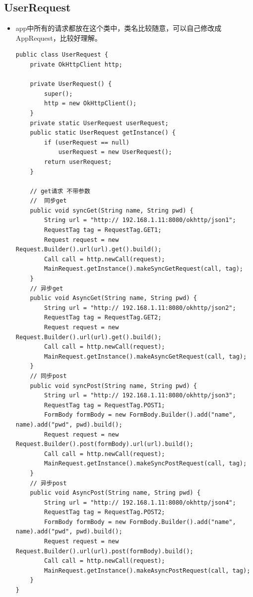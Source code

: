 \documentclass[9pt, b5paper]{article}
\begin{document}
\subsection{UserRequest}
\label{sec-4-8}
\begin{itemize}
\item app中所有的请求都放在这个类中，类名比较随意，可以自己修改成AppRequest，比较好理解。
\begin{verbatim}
public class UserRequest {
    private OkHttpClient http;

    private UserRequest() {
        super();
        http = new OkHttpClient();
    }
    private static UserRequest userRequest;
    public static UserRequest getInstance() {
        if (userRequest == null) 
            userRequest = new UserRequest();
        return userRequest;
    }

    // get请求 不带参数
    //  同步get
    public void syncGet(String name, String pwd) {
        String url = "http:// 192.168.1.11:8080/okhttp/json1";
        RequestTag tag = RequestTag.GET1;
        Request request = new Request.Builder().url(url).get().build();
        Call call = http.newCall(request);
        MainRequest.getInstance().makeSyncGetRequest(call, tag);
    }
    // 异步get
    public void AsyncGet(String name, String pwd) {
        String url = "http:// 192.168.1.11:8080/okhttp/json2";
        RequestTag tag = RequestTag.GET2;
        Request request = new Request.Builder().url(url).get().build();
        Call call = http.newCall(request);
        MainRequest.getInstance().makeAsyncGetRequest(call, tag);
    }
    // 同步post
    public void syncPost(String name, String pwd) {
        String url = "http:// 192.168.1.11:8080/okhttp/json3";
        RequestTag tag = RequestTag.POST1;
        FormBody formBody = new FormBody.Builder().add("name", name).add("pwd", pwd).build();
        Request request = new Request.Builder().post(formBody).url(url).build();
        Call call = http.newCall(request);
        MainRequest.getInstance().makeSyncPostRequest(call, tag);
    }
    // 异步post
    public void AsyncPost(String name, String pwd) {
        String url = "http:// 192.168.1.11:8080/okhttp/json4";
        RequestTag tag = RequestTag.POST2;
        FormBody formBody = new FormBody.Builder().add("name", name).add("pwd", pwd).build();
        Request request = new Request.Builder().url(url).post(formBody).build();
        Call call = http.newCall(request);
        MainRequest.getInstance().makeAsyncPostRequest(call, tag);
    }
}
\end{verbatim}
\end{itemize}
\end{document}
